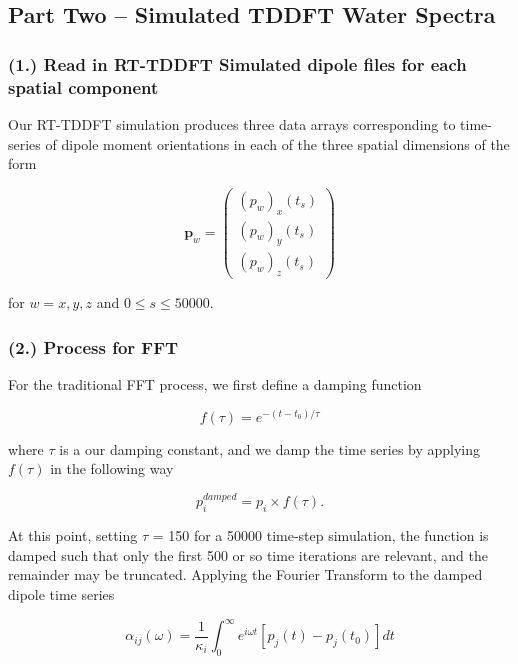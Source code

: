 \documentclass[11pt]{article}
\begin{document}
\subsection*{Part Two -- Simulated TDDFT Water Spectra}

\subsubsection*{(1.)	Read in RT-TDDFT Simulated dipole files for each spatial component}
Our RT-TDDFT simulation produces three data arrays corresponding to time-series of dipole moment orientations in each of the three spatial dimensions of the form

\begin{equation}\label{eq:dipoles}
	\mathbf{p}_{w}= \begin{pmatrix} (p_{w})_{x}(t_{s})\\  (p_{w})_{y}(t_{s}) \\  (p_{w})_{z}(t_{s})\end{pmatrix}
\end{equation}

for $w = x, y, z$ and $0 \leq s \leq 50000$.

\subsubsection*{(2.)	Process for FFT}

For the traditional FFT process, we first define a damping function 

\begin{equation}\label{eq:damp}
	f(\tau) = e^{-(t - t_{0}) / \tau}
\end{equation}

where $\tau$ is a our damping constant, and we damp the time series by applying $f(\tau)$ in the following way

\begin{equation}\label{eq:serdamp}
	p_{i}^{damped} = p_{i} \times f(\tau).
\end{equation}

At this point, setting $\tau$ = 150 for a 50000 time-step simulation, the function is damped such that only the first 500 or so time iterations are relevant, and the remainder may be truncated.  Applying the Fourier Transform to the damped dipole time series 

\begin{equation}\label{eq:pol}
	\alpha_{ij}(\omega) = \frac{1}{\kappa_{i}}\int_{0}^{\infty}  e^{i\omega t} [p_{j}(t) - p_{j}(t_{0})] dt
\end{equation}
\end{document}
